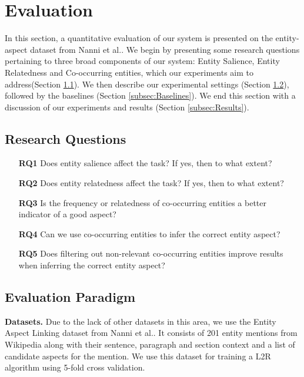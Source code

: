 \newcommand{\todo}[1]{\textcolor{red}{TODO: #1}\PackageWarning{TODO:}{#1!}}

\section{Evaluation}
\label{sec:Evaluation}
In this section, a quantitative evaluation of our system is presented on the entity-aspect dataset from Nanni et al.\cite{nanni2018entity}. We begin by presenting some research questions pertaining to three broad components of our system: Entity Salience, Entity Relatedness and Co-occurring entities, which our experiments aim to address(Section \ref{subsec:Research Questions}). We then describe our experimental settings (Section \ref{subsec:Evaluation Paradigm}), followed by the baselines (Section \ref{subsec:Baselines}). We end this section with a discussion of our experiments and results (Section \ref{subsec:Results}).

\subsection{Research Questions}
\label{subsec:Research Questions}

\begin{itemize}
\item[\textbf{RQ1}] Does entity salience affect the task? If yes, then to what extent?
\item[\textbf{RQ2}] Does entity relatedness affect the task? If yes, then to what extent? 
\item[\textbf{RQ3}] Is the frequency or relatedness of co-occurring entities a better indicator of a good aspect?
\item[\textbf{RQ4}] Can we use co-occurring entities to infer the correct entity aspect?
\item[\textbf{RQ5}] Does filtering out non-relevant co-occurring entities improve results when inferring the correct entity aspect?
\end{itemize}

\subsection{Evaluation Paradigm}
\label{subsec:Evaluation Paradigm}

\textbf{Datasets.} Due to the lack of other datasets in this area, we use the Entity Aspect Linking dataset from Nanni et al.\cite{nanni2018entity}. It consists of 201 entity mentions from Wikipedia along with their sentence, paragraph and section context and a list of candidate aspects for the mention. We use this dataset for training a L2R algorithm using 5-fold cross validation. 

